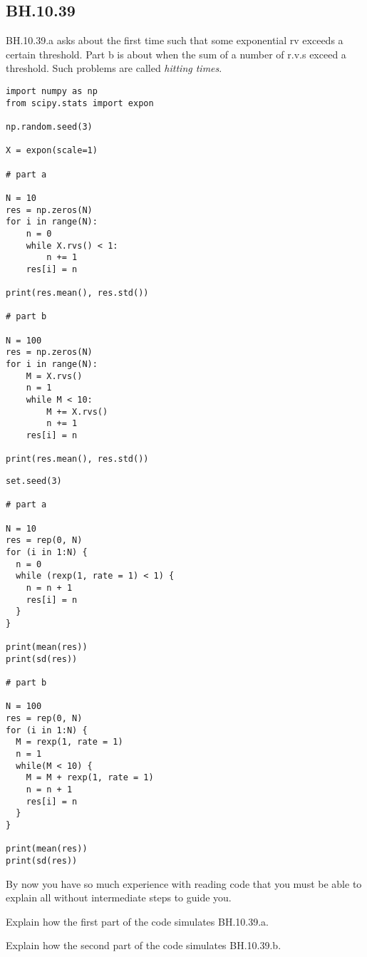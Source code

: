 

\subsection{BH.10.39}

BH.10.39.a asks about the first time such that some exponential rv exceeds a certain threshold.
Part b is about when the sum of a number of r.v.s exceed a threshold.
Such problems are called \emph{hitting times}.

\begin{verbatim}
import numpy as np
from scipy.stats import expon

np.random.seed(3)

X = expon(scale=1)

# part a

N = 10
res = np.zeros(N)
for i in range(N):
    n = 0
    while X.rvs() < 1:
        n += 1
    res[i] = n

print(res.mean(), res.std())

# part b

N = 100
res = np.zeros(N)
for i in range(N):
    M = X.rvs()
    n = 1
    while M < 10:
        M += X.rvs()
        n += 1
    res[i] = n

print(res.mean(), res.std())
\end{verbatim}

\begin{verbatim}
set.seed(3)

# part a

N = 10
res = rep(0, N)
for (i in 1:N) {
  n = 0
  while (rexp(1, rate = 1) < 1) {
    n = n + 1
    res[i] = n
  }
}

print(mean(res))
print(sd(res))

# part b

N = 100
res = rep(0, N)
for (i in 1:N) {
  M = rexp(1, rate = 1)
  n = 1
  while(M < 10) {
    M = M + rexp(1, rate = 1)
    n = n + 1
    res[i] = n
  }
}

print(mean(res))
print(sd(res))
\end{verbatim}


By now you have so much experience with reading code that you must be able to explain all without intermediate steps to guide you.
\begin{exercise}
Explain how the first part of the code simulates BH.10.39.a.
\end{exercise}

\begin{exercise}
Explain how the second part of the code simulates BH.10.39.b.
\end{exercise}

